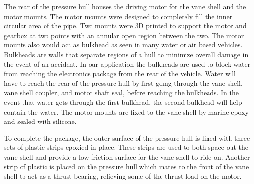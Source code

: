 \documentclass{report}
\begin{document}
The rear of the pressure hull houses the driving motor for the vane shell and the motor mounts.  The motor mounts were designed to completely fill the inner circular area of the pipe.  Two mounts were 3D printed to support the motor and gearbox at two points with an annular open region between the two.  The motor mounts also would act as bulkhead as seen in many water or air based vehicles.  Bulkheads are walls that separate regions of a hull to minimize overall damage in the event of an accident.  In our application the bulkheads are used to block water from reaching the electronics package from the rear of the vehicle.  Water will have to reach the rear of the pressure hull by first going through the vane shell, vane shell coupler, and motor shaft seal, before reaching the bulkheads.  In the event that water gets through the first bulkhead, the second bulkhead will help contain the water.  The motor mounts are fixed to the vane shell by marine epoxy and sealed with silicone. \par 
To complete the package, the outer surface of the pressure hull is lined with three sets of plastic strips epoxied in place.  These strips are used to both space out the vane shell and provide a low friction surface for the vane shell to ride on.  Another strip of plastic is placed on the pressure hull which mates to the front of the vane shell to act as a thrust bearing, relieving some of the thrust load on the motor.  
\end{document}

